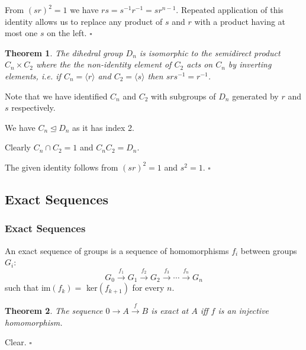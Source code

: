\documentclass[10pt]{article}
\newtheorem{theorem}{Theorem}[section]
\newenvironment{proof}[1][Proof]{\begin{trivlist}
\item[\hskip \labelsep {\itshape #1}]}{\end{trivlist}}
\newenvironment{definition}[1][Definition]{\begin{trivlist}
\item[\hskip \labelsep {\bfseries #1}]}{\end{trivlist}}
\begin{document}
\begin{proof}
From $(sr)^2 = 1$ we have $rs = s^{-1}r^{-1} = sr^{n-1}$. Repeated application of this identity allows us to replace any product of $s$ and $r$ with a product having at most one $s$ on the left. $\square$
\end{proof}

\begin{theorem}
The dihedral group $D_n$ is isomorphic to the semidirect product $C_n\times C_2$ where the the non-identity element of $C_2$ acts on $C_n$ by inverting elements, i.e. if $C_n = \langle r \rangle$ and $C_2 = \langle s \rangle$ then $srs^{-1} = r^{-1}$.
\end{theorem}

\begin{proof}
Note that we have identified $C_n$ and $C_2$ with subgroups of $D_n$ generated by $r$ and $s$ respectively.

We have $C_n \mathrel{\unlhd} D_n$ as it has index 2.

Clearly $C_n\cap C_2 = 1$ and $C_nC_2 = D_n$.

The given identity follows from $(sr)^2 = 1$ and $s^2 = 1$. $\square$
\end{proof}

\subsection{Exact Sequences}

\subsubsection{Exact Sequences}

\begin{definition}
An exact sequence of groups is a sequence of homomorphisms $f_i$ between groups $G_i$:
$$G_0 \overset{f_1}{\longrightarrow} G_1 \overset{f_2}{\longrightarrow} G_{2} \overset{f_{3}}{\longrightarrow} \cdots \overset{f_n}{\to} G_n$$
such that im$(f_k) =$ ker$(f_{k+1})$ for every $n$.
\end{definition}

\begin{theorem}
The sequence $0 \longrightarrow A \overset{f}{\longrightarrow} B$ is exact at $A$ iff $f$ is an injective homomorphism.
\end{theorem}

\begin{proof}
Clear. $\square$
\end{proof}
\end{document}
